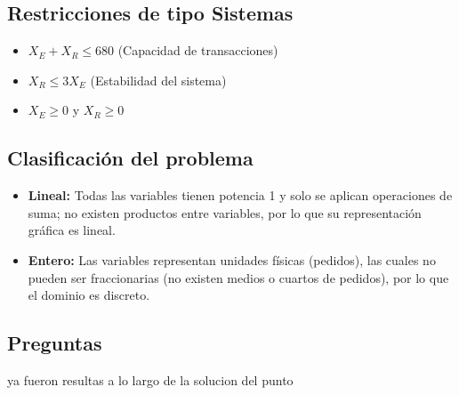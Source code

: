 \documentclass{article}
\begin{document}
\subsection*{Restricciones de tipo Sistemas}
\begin{itemize}
    \item $X_E + X_R \leq 680$ (Capacidad de transacciones)
    \item $X_R \leq 3X_E$ (Estabilidad del sistema)
    \item $X_E \geq 0$ y $X_R \geq 0$ 
\end{itemize}

\subsection*{Clasificación del problema}
\begin{itemize}
    \item \textbf{Lineal:} Todas las variables tienen potencia 1 y solo se aplican operaciones de suma; no existen productos entre variables, por lo que su representación gráfica es lineal.
    \item \textbf{Entero:} Las variables representan unidades físicas (pedidos), las cuales no pueden ser fraccionarias (no existen medios o cuartos de pedidos), por lo que el dominio es discreto.
\end{itemize}
\subsection*{Preguntas}
ya fueron resultas a lo largo de la solucion del punto 
\end{document}
